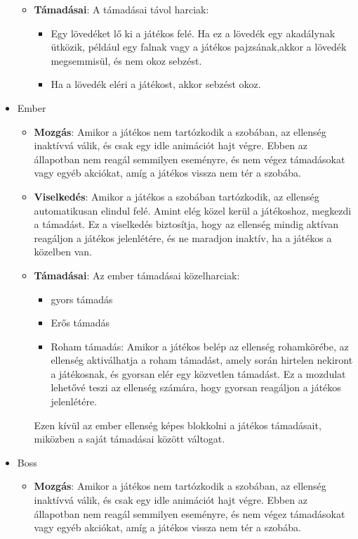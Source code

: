 \documentclass[
]{thesis-ekf}
\theoremstyle{definition}
\theoremstyle{remark}
\begin{document}
\begin{itemize}
\begin{itemize}
\begin{itemize}
		\end{itemize}
		\item \textbf{Támadásai}: A támadásai távol harciak:
		\begin{itemize}
			\item Egy lövedéket lő ki a játékos felé. Ha ez a lövedék egy akadálynak ütközik, például egy falnak vagy a játékos pajzsának,akkor a lövedék megsemmisül, és nem okoz sebzést.
			\item Ha a lövedék eléri a játékost, akkor sebzést okoz.
		\end{itemize}
		
	\end{itemize}
	\item Ember
	\begin{itemize}
		\item \textbf{Mozgás}: Amikor a játékos nem tartózkodik a szobában, az ellenség inaktívvá válik, és csak egy idle animációt hajt végre. Ebben az állapotban nem reagál semmilyen eseményre, és nem végez támadásokat vagy egyéb akciókat, amíg a játékos vissza nem tér a szobába.
		\item \textbf{Viselkedés}: Amikor a játékos a szobában tartózkodik, az ellenség automatikusan elindul felé. Amint elég közel kerül a játékoshoz, megkezdi a támadást. Ez a viselkedés biztosítja, hogy az ellenség mindig aktívan reagáljon a játékos jelenlétére, és ne maradjon inaktív, ha a játékos a közelben van.
		\item \textbf{Támadásai}: Az ember támadásai közelharciak:
		\begin{itemize}
			\item gyors támadás
			\item Erős támadás
			\item Roham támadás: Amikor a játékos belép az ellenség rohamkörébe, az ellenség aktiválhatja a roham támadást, amely során hirtelen nekiront a játékosnak, és gyorsan elér egy közvetlen támadást. Ez a mozdulat lehetővé teszi az ellenség számára, hogy gyorsan reagáljon a játékos jelenlétére.
		\end{itemize}
		Ezen kívül az ember ellenség képes blokkolni a játékos támadásait, miközben a saját támadásai között váltogat.
	\end{itemize}
	\item Boss
	\begin{itemize}
		\item \textbf{Mozgás}: Amikor a játékos nem tartózkodik a szobában, az ellenség inaktívvá válik, és csak egy idle animációt hajt végre. Ebben az állapotban nem reagál semmilyen eseményre, és nem végez támadásokat vagy egyéb akciókat, amíg a játékos vissza nem tér a szobába.

\end{itemize}
\end{itemize}
\end{document}
